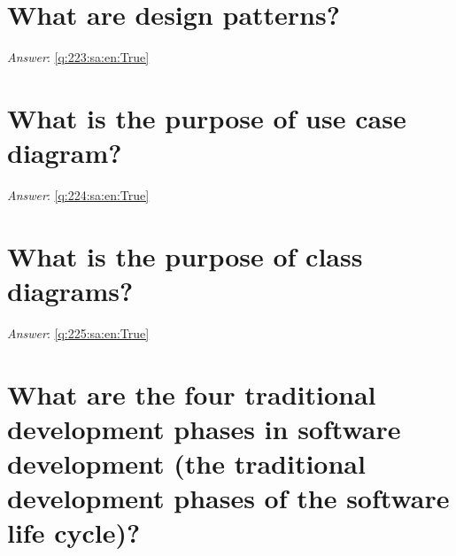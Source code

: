 \documentclass[a4paper,11pt,oneside]{book}
\begin{document}
\begin{sloppypar}
\section{What are design patterns?}

\label{q:223:sa:en:False}

\vspace{2cm}

\noindent\makebox[\textwidth]{\hrulefill}

\vspace{1cm}

\textit{Answer}: \autoref{q:223:sa:en:True}



\section{What is the purpose of use case diagram?}

\label{q:224:sa:en:False}

\vspace{2cm}

\noindent\makebox[\textwidth]{\hrulefill}

\vspace{1cm}

\textit{Answer}: \autoref{q:224:sa:en:True}



\section{What is the purpose of class diagrams?}

\label{q:225:sa:en:False}

\vspace{2cm}

\noindent\makebox[\textwidth]{\hrulefill}

\vspace{1cm}

\textit{Answer}: \autoref{q:225:sa:en:True}



\section{What are the four traditional development phases in software development (the traditional development phases of the software life cycle)?}

\label{q:226:sa:en:False}

\vspace{2cm}


\end{sloppypar}
\end{document}
